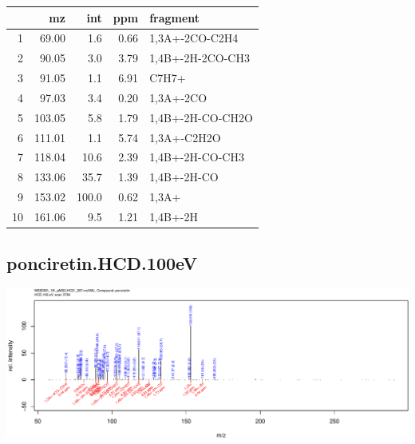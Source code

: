 \documentclass[]{article}
\begin{document}
\begin{table}[ht]
\centering
\begin{tabular}{rrrrl}
  \toprule
 & mz & int & ppm & fragment \\ 
  \midrule
1 & 69.00 & 1.6 & 0.66 & 1,3A+-2CO-C2H4 \\ 
  2 & 90.05 & 3.0 & 3.79 & 1,4B+-2H-2CO-CH3 \\ 
  3 & 91.05 & 1.1 & 6.91 & C7H7+ \\ 
  4 & 97.03 & 3.4 & 0.20 & 1,3A+-2CO \\ 
  5 & 103.05 & 5.8 & 1.79 & 1,4B+-2H-CO-CH2O \\ 
  6 & 111.01 & 1.1 & 5.74 & 1,3A+-C2H2O \\ 
  7 & 118.04 & 10.6 & 2.39 & 1,4B+-2H-CO-CH3 \\ 
  8 & 133.06 & 35.7 & 1.39 & 1,4B+-2H-CO \\ 
  9 & 153.02 & 100.0 & 0.62 & 1,3A+ \\ 
  10 & 161.06 & 9.5 & 1.21 & 1,4B+-2H \\ 
   \bottomrule
\end{tabular}
\end{table}

\clearpage\subsection{ponciretin.HCD.100eV}
\includegraphics[width=\textwidth]{WEB350_files/figure-latex/unnamed-chunk-3-36}
\end{document}
